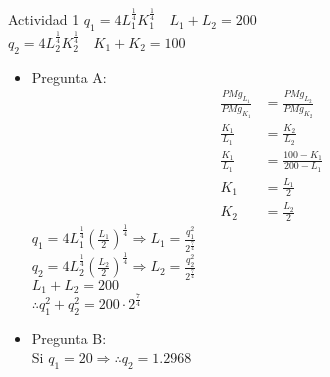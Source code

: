 \begin{frame}{Actividad 1}
		$q_1=4L_{1}^{\frac{1}{4}}K_{1}^{\frac{1}{4}} \quad L_1 + L_2 = 200$\\
		$q_2=4L_{2}^{\frac{1}{4}}K_{2}^{\frac{1}{4}} \quad K_1 + K_2 = 100$\\
	\begin{multicols}{2}
			\begin{itemize}
				\item Pregunta A:
						\begin{align*}
							\frac{PMg_{L_1}}{PMg_{K_1}} & = \frac{PMg_{L_2}}{PMg_{K_2}}\\
							\frac{K_1}{L_1} & = \frac{K_2}{L_2} \\
							\frac{K_1}{L_1} & = \frac{100-K_1}{200-L_1}\\
							K_1 & = \frac{L_1}{2} \\
							K_2 & = \frac{L_2}{2}
						\end{align*}
						$q_1=4L_{1}^{\frac{1}{4}}\left(\frac{L_1}{2} \right) ^{\frac{1}{4}} \Rightarrow L_1 = \frac{q_{1}^{2}}{2^{\frac{7}{4}}}$\\
						$q_2=4L_{2}^{\frac{1}{4}}\left(\frac{L_2}{2} \right) ^{\frac{1}{4}} \Rightarrow L_2 = \frac{q_{2}^{2}}{2^{\frac{7}{4}}}$\\
						$ L_1 + L_2 = 200$\\
						$ \therefore q_{1}^{2} + q_{2}^{2} = 200\cdot 2^{\frac{7}{4}}$
				\item Pregunta B:\\
						Si $q_1=20 \Rightarrow \therefore q_2 = 1.2968$	
			\end{itemize}
	\end{multicols}
\end{frame}